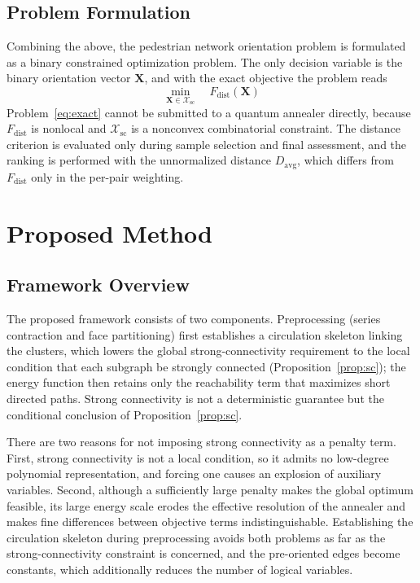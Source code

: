 \documentclass[twocolumn,a4paper]{article}
\begin{document}
\subsection{Problem Formulation}

Combining the above, the pedestrian network orientation problem is formulated as a binary constrained optimization problem. The only decision variable is the binary orientation vector \(\mathbf{X}\), and with the exact objective the problem reads
\begin{equation}
\min_{\mathbf{X}\in\mathcal{X}_{\mathrm{sc}}}\quad F_{\mathrm{dist}}(\mathbf{X})
\label{eq:exact}
\end{equation}
Problem~\eqref{eq:exact} cannot be submitted to a quantum annealer directly, because \(F_{\mathrm{dist}}\) is nonlocal and \(\mathcal{X}_{\mathrm{sc}}\) is a nonconvex combinatorial constraint. The distance criterion is evaluated only during sample selection and final assessment, and the ranking is performed with the unnormalized distance \(D_{\mathrm{avg}}\), which differs from \(F_{\mathrm{dist}}\) only in the per-pair weighting.

\section{Proposed Method} \label{sec:method}

\subsection{Framework Overview}

The proposed framework consists of two components. Preprocessing (series contraction and face partitioning) first establishes a circulation skeleton linking the clusters, which lowers the global strong-connectivity requirement to the local condition that each subgraph be strongly connected (Proposition~\ref{prop:sc}); the energy function then retains only the reachability term that maximizes short directed paths. Strong connectivity is not a deterministic guarantee but the conditional conclusion of Proposition~\ref{prop:sc}.

There are two reasons for not imposing strong connectivity as a penalty term. First, strong connectivity is not a local condition, so it admits no low-degree polynomial representation, and forcing one causes an explosion of auxiliary variables. Second, although a sufficiently large penalty makes the global optimum feasible, its large energy scale erodes the effective resolution of the annealer and makes fine differences between objective terms indistinguishable. Establishing the circulation skeleton during preprocessing avoids both problems as far as the strong-connectivity constraint is concerned, and the pre-oriented edges become constants, which additionally reduces the number of logical variables.
\end{document}
